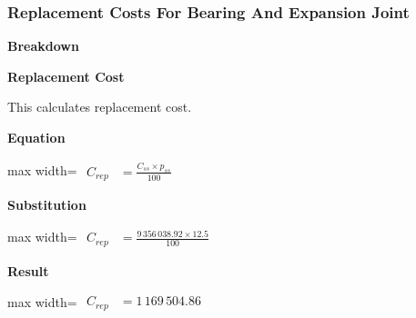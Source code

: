 \documentclass{article}
\begin{document}
\subsubsection{Replacement Costs For Bearing And Expansion Joint}
\vspace{0.4em}
\textbf{Breakdown}\par\vspace{-0.35em}
\vspace{0.4em}
\textbf{Replacement Cost}\par\vspace{-0.35em}
This calculates replacement cost.

\vspace{0.4em}
\textbf{Equation}\par\vspace{-0.35em}
\begin{center}
\begin{adjustbox}{max width=\linewidth}
$\displaystyle\begin{aligned}
C_{rep} &= \frac{C_{ss} \times p_{ss}}{100}
\end{aligned}$
\end{adjustbox}
\end{center}
\vspace{0.4em}
\textbf{Substitution}\par\vspace{-0.35em}
\begin{center}
\begin{adjustbox}{max width=\linewidth}
$\displaystyle\begin{aligned}
C_{rep} &= \frac{9\,356\,038.92 \times 12.5}{100}
\end{aligned}$
\end{adjustbox}
\end{center}
\vspace{0.4em}
\textbf{Result}\par\vspace{-0.35em}
\begin{center}
\begin{adjustbox}{max width=\linewidth}
$\displaystyle\begin{aligned}
C_{rep} &= 1\,169\,504.86
\end{aligned}$
\end{adjustbox}
\end{center}
\vspace{0.4em}
\end{document}
